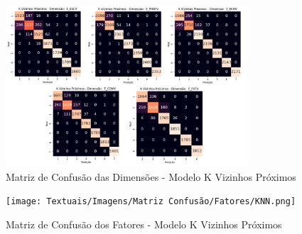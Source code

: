 \begin{apendicesenv}
\begin{figure}[ht]
    \centering
    \includegraphics[width=0.8\textwidth]{Textuais/Imagens/Matriz Confusão/Dimensões/dim_knn.png}
    \caption{Matriz de Confusão das Dimensões - Modelo K Vizinhos Próximos}
    \label{fig:matriz_confusao_dim_knn}
\end{figure}

\begin{figure}[ht]
    \centering
    \texttt{[image: Textuais/Imagens/Matriz Confusão/Fatores/KNN.png]}
    \caption{Matriz de Confusão dos Fatores - Modelo K Vizinhos Próximos}
    \label{fig:matriz_confusao_fat_knn}
\end{figure}

                      \end{apendicesenv}
